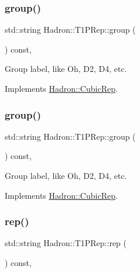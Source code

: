 \subsubsection{\texorpdfstring{group()}{group()}\hspace{0.1cm}{\footnotesize\ttfamily [1/2]}}
{\footnotesize\ttfamily std\+::string Hadron\+::\+T1\+P\+Rep\+::group (\begin{DoxyParamCaption}{ }\end{DoxyParamCaption}) const\hspace{0.3cm}{\ttfamily [inline]}, {\ttfamily [virtual]}}

Group label, like Oh, D2, D4, etc. 

Implements \mbox{\hyperlink{structHadron_1_1CubicRep_a0748f11ec87f387062c8e8981339a29c}{Hadron\+::\+Cubic\+Rep}}.

\mbox{\label{structHadron_1_1T1PRep_a9e319545acc323df42a4668547bac994}} 
\subsubsection{\texorpdfstring{group()}{group()}\hspace{0.1cm}{\footnotesize\ttfamily [2/2]}}
{\footnotesize\ttfamily std\+::string Hadron\+::\+T1\+P\+Rep\+::group (\begin{DoxyParamCaption}{ }\end{DoxyParamCaption}) const\hspace{0.3cm}{\ttfamily [inline]}, {\ttfamily [virtual]}}

Group label, like Oh, D2, D4, etc. 

Implements \mbox{\hyperlink{structHadron_1_1CubicRep_a0748f11ec87f387062c8e8981339a29c}{Hadron\+::\+Cubic\+Rep}}.

\mbox{\label{structHadron_1_1T1PRep_abf59dcb0de05bb6acf26b43d0dd5e281}} 
\subsubsection{\texorpdfstring{rep()}{rep()}\hspace{0.1cm}{\footnotesize\ttfamily [1/2]}}
{\footnotesize\ttfamily std\+::string Hadron\+::\+T1\+P\+Rep\+::rep (\begin{DoxyParamCaption}{ }\end{DoxyParamCaption}) const\hspace{0.3cm}{\ttfamily [inline]}, {\ttfamily [virtual]}}

